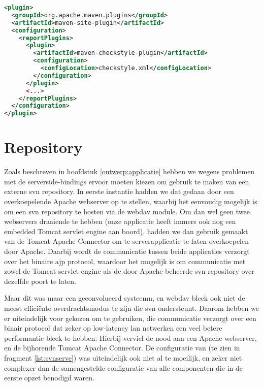 \begin{lstlisting}[language=XML, float, caption=Configuratie van de Maven site plugin voor het genereren van Checkstyle reports., label=lst:maven:reporting]
<plugin>
  <groupId>org.apache.maven.plugins</groupId>
  <artifactId>maven-site-plugin</artifactId>
  <configuration>
    <reportPlugins>
      <plugin>
        <artifactId>maven-checkstyle-plugin</artifactId>
        <configuration>
          <configLocation>checkstyle.xml</configLocation>
        </configuration>
      </plugin>
      <...>
    </reportPlugins>
  </configuration>
</plugin>
\end{lstlisting}

\section{Repository}
\label{server:deployment:repository}

Zoals beschreven in hoofdstuk \ref{ontwerp:applicatie} hebben we wegens problemen met de serverside-bindings ervoor moeten kiezen om gebruik te maken van een externe \ac{svn} repository. In eerste instantie hadden we dat gedaan door een overkoepelende Apache webserver op te stellen, waarbij het eenvoudig mogelijk is om een \ac{svn} repository te hosten via de  \ac{webdav} module. Om dan wel geen twee webservers draaiende te hebben (onze applicatie heeft immers ook nog een embedded Tomcat servlet engine aan boord), hadden we dan gebruik gemaakt van de  Tomcat Apache Connector om te serverapplicatie te laten overkoepelen door Apache. Daarbij wordt de communicatie tussen beide applicaties verzorgt over het binaire \ac{ajp} protocol, waardoor het mogelijk is om communicatie met zowel de Tomcat servlet-engine als de door Apache beheerde \ac{svn} repository over dezelfde poort te laten.

Maar dit was maar een geconvolueerd systeemn, en \ac{webdav} bleek ook niet de meest efficiënte overdrachtsmodus te zijn die \ac{svn} ondersteunt. Daarom hebben we er uiteindelijk voor gekozen om  te gebruiken, die communicatie verzorgt over een binair protocol dat zeker op low-latency \ac{lan} netwerken een veel betere performantie bleek te hebben. Hierbij verviel de nood aan een Apache webserver, en de bijhorende Tomcat Apache Connector. De configuratie van  (te zien in fragment \ref{lst:svnserve}) was uiteindelijk ook niet al te moeilijk, en zeker niet complexer dan de samengestelde configuratie van alle componenten die in de eerste opzet benodigd waren.

